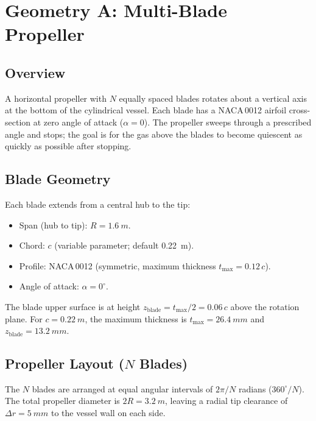 \documentclass[11pt,a4paper]{article}
\begin{document}
\section{Geometry A: Multi-Blade Propeller}
\label{sec:propeller}

\subsection{Overview}

A horizontal propeller with $N$ equally spaced blades rotates about a
vertical axis at the bottom of the cylindrical vessel. Each blade has a
NACA\,0012 airfoil cross-section at zero angle of attack ($\alpha = 0$).
The propeller sweeps through a prescribed angle and stops; the goal is
for the gas above the blades to become quiescent as quickly as possible
after stopping.

\subsection{Blade Geometry}

Each blade extends from a central hub to the tip:
\begin{itemize}
  \item Span (hub to tip): $R = \SI{1.6}{m}$.
  \item Chord: $c$ (variable parameter; default \SI{0.22}{m}).
  \item Profile: NACA\,0012 (symmetric, maximum thickness
        $t_\mathrm{max} = 0.12\,c$).
  \item Angle of attack: $\alpha = 0^\circ$.
\end{itemize}

The blade upper surface is at height $z_\mathrm{blade} = t_\mathrm{max}/2
= 0.06\,c$ above the rotation plane. For $c = \SI{0.22}{m}$, the
maximum thickness is $t_\mathrm{max} = \SI{26.4}{mm}$ and
$z_\mathrm{blade} = \SI{13.2}{mm}$.

\subsection{Propeller Layout ($N$ Blades)}

The $N$ blades are arranged at equal angular intervals of $2\pi/N$
radians ($360^\circ/N$). The total propeller diameter is $2R = \SI{3.2}{m}$,
leaving a radial tip clearance of $\Delta r = \SI{5}{mm}$ to the
vessel wall on each side.
\end{document}
